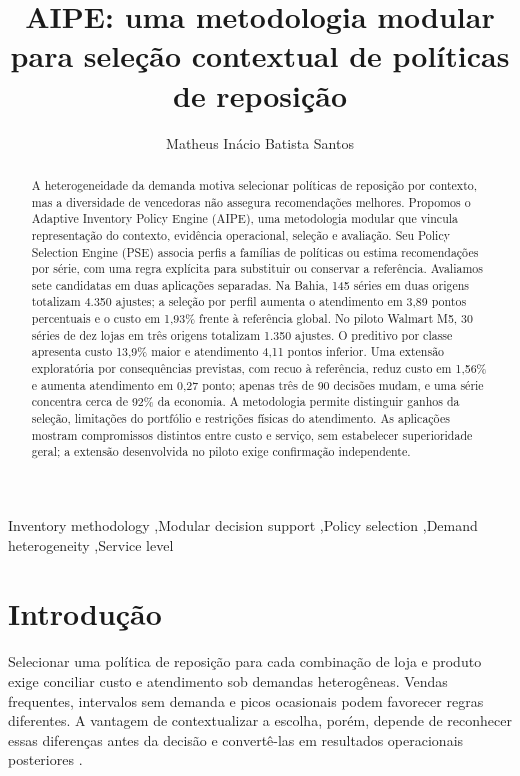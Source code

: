 \documentclass[preprint,12pt]{elsarticle}
\begin{document}
\begin{frontmatter}
\title{AIPE: uma metodologia modular para seleção contextual de políticas de reposição}
\author[ufal]{Matheus Inácio Batista Santos}
\begin{abstract}
A heterogeneidade da demanda motiva selecionar políticas de reposição por contexto, mas a diversidade de vencedoras não assegura recomendações melhores. Propomos o Adaptive Inventory Policy Engine (AIPE), uma metodologia modular que vincula representação do contexto, evidência operacional, seleção e avaliação. Seu Policy Selection Engine (PSE) associa perfis a famílias de políticas ou estima recomendações por série, com uma regra explícita para substituir ou conservar a referência. Avaliamos sete candidatas em duas aplicações separadas. Na Bahia, 145 séries em duas origens totalizam 4.350 ajustes; a seleção por perfil aumenta o atendimento em 3,89 pontos percentuais e o custo em 1,93\% frente à referência global. No piloto Walmart M5, 30 séries de dez lojas em três origens totalizam 1.350 ajustes. O preditivo por classe apresenta custo 13,9\% maior e atendimento 4,11 pontos inferior. Uma extensão exploratória por consequências previstas, com recuo à referência, reduz custo em 1,56\% e aumenta atendimento em 0,27 ponto; apenas três de 90 decisões mudam, e uma série concentra cerca de 92\% da economia. A metodologia permite distinguir ganhos da seleção, limitações do portfólio e restrições físicas do atendimento. As aplicações mostram compromissos distintos entre custo e serviço, sem estabelecer superioridade geral; a extensão desenvolvida no piloto exige confirmação independente.

\end{abstract}
\begin{keyword}
Inventory methodology \sep Modular decision support \sep Policy selection \sep Demand heterogeneity \sep Service level
\end{keyword}
\end{frontmatter}

\section{Introdução}
Selecionar uma política de reposição para cada combinação de loja e produto exige conciliar custo e atendimento sob demandas heterogêneas. Vendas frequentes, intervalos sem demanda e picos ocasionais podem favorecer regras diferentes. A vantagem de contextualizar a escolha, porém, depende de reconhecer essas diferenças antes da decisão e convertê-las em resultados operacionais posteriores \cite{Axsater2006InventoryControl}.
\end{document}
